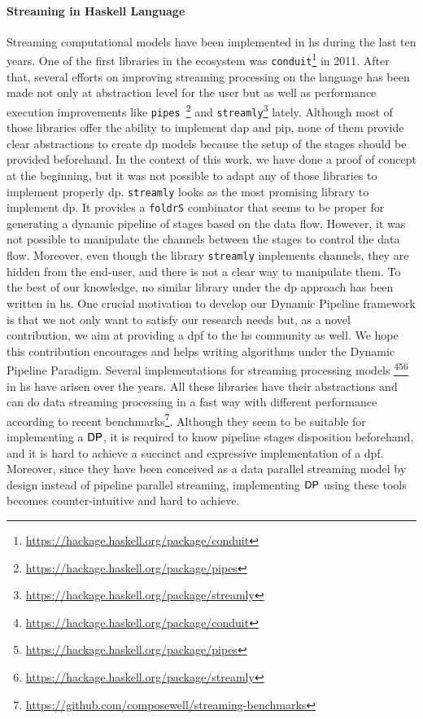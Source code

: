 \paragraph{Streaming in Haskell Language}
Streaming computational models have been implemented in \acrlong{hs} during the last ten years. One of the first libraries in the ecosystem was \texttt{conduit}\footnote{\url{https://hackage.haskell.org/package/conduit}} in 2011.
After that, several efforts on improving streaming processing on the language has been made not only at abstraction level for the user but as well as performance execution improvements like \texttt{pipes}~\footnote{\url{https://hackage.haskell.org/package/pipes}} and \texttt{streamly}\footnote{\url{https://hackage.haskell.org/package/streamly}} lately.
Although most of those libraries offer the ability to implement \acrshort{dap} and \acrshort{pip}, none of them provide clear abstractions to create \acrshort{dp} models because the setup of the stages should be provided beforehand. In the context of this work, we have done a proof of concept at the beginning, but it was not possible to adapt any of those libraries to implement properly \acrshort{dp}.  \texttt{streamly} looks as the most promising library to implement \acrshort{dp}. It provides a \texttt{foldrS} combinator that seems to be proper for generating a dynamic pipeline of stages based on the data flow. However, it was not possible to manipulate the channels between the stages to control the data flow. Moreover,  even though the library  \texttt{streamly} implements channels, they are hidden from the end-user, and there is not a  clear way to manipulate them. 
To the best of our knowledge, no similar library under the  \acrshort{dp} approach has been written in \acrlong{hs}. 
One crucial motivation to develop our Dynamic Pipeline framework is that we not only want to satisfy our research needs but, as a novel contribution, we aim at providing a \acrshort{dpf} to the \acrshort{hs} community as well. We hope this contribution encourages and helps writing algorithms under the Dynamic Pipeline Paradigm. 
\iffalse
Several implementations for streaming processing models \footnote{\url{https://hackage.haskell.org/package/conduit}}\footnote{\url{https://hackage.haskell.org/package/pipes}}\footnote{\url{https://hackage.haskell.org/package/streamly}} in \acrshort{hs} have arisen over the years. All these libraries have their abstractions and can do data streaming processing in a fast way with different performance according to recent benchmarks\footnote{\url{https://github.com/composewell/streaming-benchmarks}}. Although they seem to be suitable for implementing a $\mathsf{DP}$, it is required to know pipeline stages disposition beforehand, and it is hard to achieve a succinct and expressive implementation of a \acrshort{dpf}. Moreover, since they have been conceived as a data parallel streaming model \cite{hr19} by design instead of pipeline parallel streaming, implementing $\mathsf{DP}$ using these tools becomes counter-intuitive and hard to achieve.
